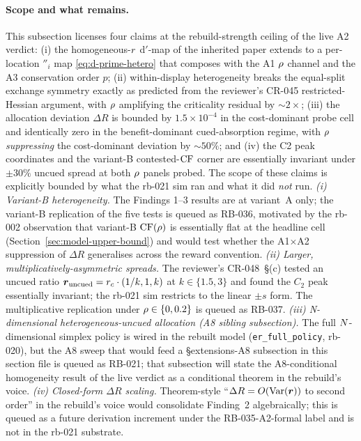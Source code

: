 \paragraph{Scope and what remains.}
This subsection licenses four claims at the rebuild-strength ceiling
of the live A2 verdict: (i) the homogeneous-$r$ d$'$-map of
the inherited paper extends to a per-location $\dprime_i$ map
\eqref{eq:d-prime-hetero} that composes with the A1 $\rho$ channel
and the A3 conservation order $p$; (ii) within-display heterogeneity
breaks the equal-split exchange symmetry exactly as predicted from
the reviewer's CR-045 restricted-Hessian argument, with $\rho$
amplifying the criticality residual by $\sim\!2\times$; (iii) the
allocation deviation $\Delta R$ is bounded by $1.5\!\times\!10^{-4}$
in the cost-dominant probe cell and identically zero in the
benefit-dominant cued-absorption regime, with $\rho$
\emph{suppressing} the cost-dominant deviation by $\sim\!50\%$; and
(iv) the C2 peak coordinates and the variant-B contested-$\mathrm{CF}$ corner
are essentially invariant under $\pm30\%$ uncued spread at both
$\rho$ panels probed.
The scope of these claims is explicitly bounded by what the rb-021
sim ran and what it did \emph{not} run. \emph{(i) Variant-B
heterogeneity.} The Findings 1--3 results are at variant~A only; the
variant-B replication of the five tests is queued as RB-036, motivated
by the rb-002 observation that variant-B $\mathrm{CF}(\rho)$ is essentially
flat at the headline cell (Section~\ref{sec:model-upper-bound}) and
would test whether the A1$\times$A2 suppression of $\Delta R$
generalises across the reward convention. \emph{(ii) Larger,
multiplicatively-asymmetric spreads.} The reviewer's CR-048~§(c)
tested an uncued ratio $\boldsymbol{r}_{\mathrm{uncued}} =
r_c \cdot (1/k, 1, k)$ at $k \in \{1.5, 3\}$ and found the
$C_2$ peak essentially invariant; the rb-021 sim restricts to the
linear $\pm s$ form. The multiplicative replication under
$\rho \in \{0, 0.2\}$ is queued as RB-037. \emph{(iii) N-dimensional
heterogeneous-uncued allocation (A8 sibling subsection).} The full
$N$-dimensional simplex policy is wired in the rebuilt model
(\texttt{er\_full\_policy}, rb-020), but the A8 sweep that would feed
a §extensions-A8 subsection in this section file is queued as RB-021;
that subsection will state the A8-conditional homogeneity result of
the live verdict as a conditional theorem in the rebuild's voice.
\emph{(iv) Closed-form $\Delta R$ scaling.} Theorem-style
``$\Delta R = O(\mathrm{Var}(\boldsymbol{r}))$ to second order''
in the rebuild's voice would consolidate Finding~2 algebraically;
this is queued as a future derivation increment under the
RB-035-A2-formal label and is not in the rb-021 substrate.

